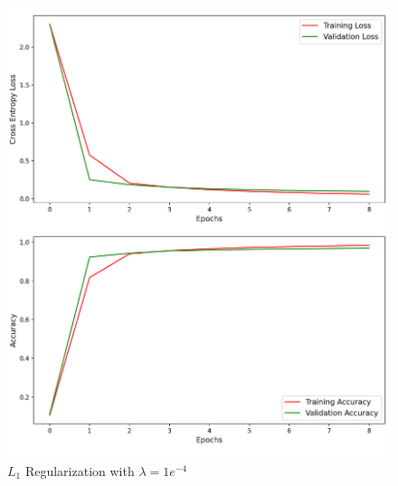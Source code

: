 \begin{figure}[!ht]
	\centering
	\includegraphics[width=1.0\textwidth]{./images/l1_e4.png}
	\caption{$L_1$ Regularization with $\lambda = 1e^{-4}$}
	\label{fig:l1_1e4}
\end{figure}


